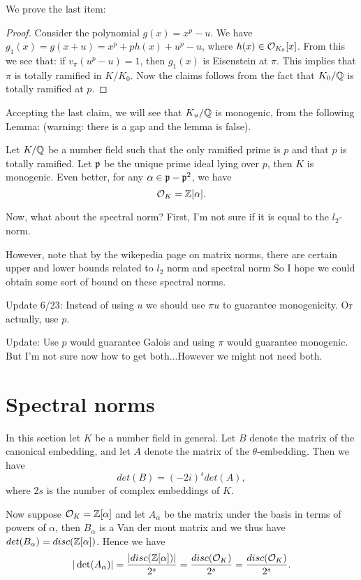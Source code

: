 \documentclass{amsart}
\begin{document}
We prove the last item:
\begin{proof}
Consider the polynomial $g(x) = x^p - u$. We have
$g_1(x) = g(x+u) = x^p + ph(x) + u^p - u$, where $h(x) \in \mathcal{O}_{K_0}[x]$.
From this we see that: if $v_\pi(u^p- u) = 1$, then $g_1(x)$ is
Eisenstein at $\pi$. This implies that $\pi$ is totally ramified in $K/K_0$. Now the claims follows from the fact that $K_0/\mathbb{Q}$
is totally ramified at $p$.
\end{proof}

Accepting the last claim, we will see that $K_u/\mathbb{Q}$ is monogenic, from the following Lemma: (warning: there is a gap and the lemma is false).

\begin{Lemma}
Let $K/\mathbb{Q}$ be a number field such that the only ramified prime is $p$ and that $p$ is totally ramified. Let $\mathfrak{p}$ be the unique prime ideal lying over $p$, then $K$ is monogenic. Even better, for any $\alpha \in \mathfrak{p} - \mathfrak{p}^2$, we have
\[
    \mathcal{O}_K = \mathbb{Z}[\alpha].
\]
\end{Lemma}

Now, what about the spectral norm? First, I'm not sure if it is equal to the $l_2$-norm.

However, note that by the wikepedia page on matrix norms, there are certain upper and lower bounds related to $l_2$ norm and spectral norm
 So I hope we could obtain some sort of bound on these spectral norms.


Update 6/23: Instead of using $u$ we should use $\pi u$ to guarantee monogenicity. Or actually, use $p$.

Update: Use $p$ would guarantee Galois and using $\pi$ would guarantee monogenic.
But I'm not sure now how to get both...However we might not need both.


\section{Spectral norms}

In this section let $K$ be a number field in general. Let $B$ denote the matrix of the canonical embedding, and let $A$ denote the matrix of the $\theta$-embedding.
Then we have
\[
    det(B) = (-2i)^s det(A),
\]
where $2s$ is the number of complex embeddings of $K$.

Now suppose $\mathcal{O}_K = \mathbb{Z}[\alpha]$ and let $A_\alpha$ be the matrix under the basis in terms of powers of $\alpha$, then $B_\alpha$ is a Van der mont matrix
and we thus have $det(B_\alpha) = disc(\mathbb{Z}[\alpha])$. Hence we have
$$|\det(A_\alpha)| = \frac{|disc(\mathbb{Z}[\alpha])|}{2^s} = \frac{disc(\mathcal{O}_K)}{2^s} = \frac{disc(\mathcal{O}_K)}{2^s}.$$
\end{document}
